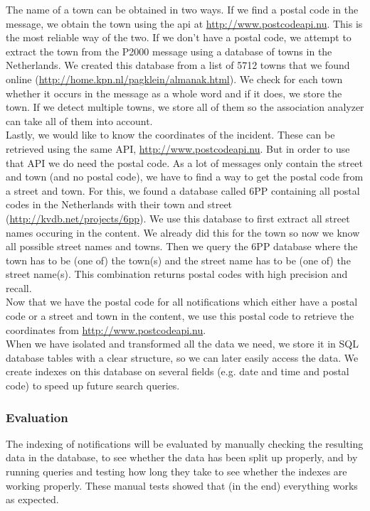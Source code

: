 The name of a town can be obtained in two ways. If we find a postal code in the message, we obtain the town using the api at \url{http://www.postcodeapi.nu}. This is the most reliable way of the two. If we don't have a postal code, we attempt to extract the town from the P2000 message using a database of towns in the Netherlands. We created this database from a list of 5712 towns that we found online (\url{http://home.kpn.nl/pagklein/almanak.html}). We check for each town whether it occurs in the message as a whole word and if it does, we store the town. If we detect multiple towns, we store all of them so the association analyzer can take all of them into account.\\

Lastly, we would like to know the coordinates of the incident. These can be retrieved using the same API, \url{http://www.postcodeapi.nu}. But in order to use that API we do need the postal code. As a lot of messages only contain the street and town (and no postal code), we have to find a way to get the postal code from a street and town. For this, we found a database called 6PP containing all postal codes in the Netherlands with their town and street (\url{http://kvdb.net/projects/6pp}). We use this database to first extract all street names occuring in the content. We already did this for the town so now we know all possible street names and towns. Then we query the 6PP database where the town has to be (one of) the town(s) and the street name has to be (one of) the street name(s). This combination returns postal codes with high precision and recall.\\

Now that we have the postal code for all notifications which either have a postal code or a street and town in the content, we use this postal code to retrieve the coordinates from \url{http://www.postcodeapi.nu}.\\

When we have isolated and transformed all the data we need, we store it in SQL database tables with a clear structure, so we can later easily access the data. We create indexes on this database on several fields (e.g. date and time and postal code) to speed up future search queries.
\subsubsection*{Evaluation}
The indexing of notifications will be evaluated by manually checking the resulting data in the database, to see whether the data has been split up properly, and by running queries and testing how long they take to see whether the indexes are working properly. These manual tests showed that (in the end) everything works as expected.